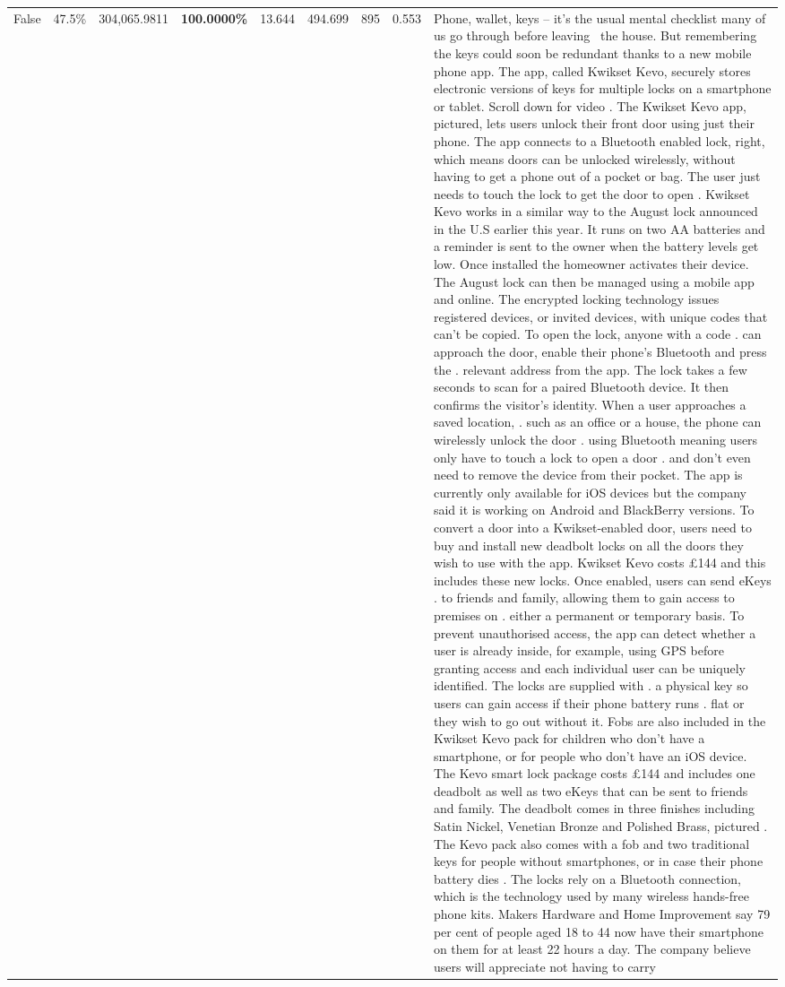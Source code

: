 \begin{table}[H]
\begin{tabular}{lllrlllll}
False & 47.5\% & \color{red} 304,065.9811 & \bfseries \color{red} 100.0000\% & 13.644 & 494.699 & 895 & 0.553 & Phone, wallet, keys – it’s the usual mental checklist many of us go through before leaving  the house. But remembering the keys could soon be redundant thanks to a new mobile phone app. The app, called Kwikset Kevo, securely stores electronic versions of keys for multiple locks on a smartphone or tablet. Scroll down for video . The Kwikset Kevo app, pictured, lets users unlock their front door using just their phone. The app connects to a Bluetooth enabled lock, right, which means doors can be unlocked wirelessly, without having to get a phone out of a pocket or bag. The user just needs to touch the lock to get the door to open . Kwikset Kevo works in a similar way to the August lock announced in the U.S earlier this year. It runs on two AA batteries and a reminder is sent to the owner when the battery levels get low. Once installed the homeowner activates their device. The August lock can then be managed using a mobile app and online. The encrypted locking technology issues registered devices, or invited devices, with unique codes that can't be copied. To open the lock, anyone with a code . can approach the door, enable their phone's Bluetooth and press the . relevant address from the app. The lock takes a few seconds to scan for a paired Bluetooth device. It then confirms the visitor's identity. When a user approaches a saved location, . such as an office or a house, the phone can wirelessly unlock the door . using Bluetooth meaning users only have to touch a lock to open a door . and don't even need to remove the device from their pocket. The app is currently only available for iOS devices but the company said it is working on Android and BlackBerry versions. To convert a door into a Kwikset-enabled door, users need to buy and install new deadbolt locks on all the doors they wish to use with the app. Kwikset Kevo costs £144 and this includes these new locks. Once enabled, users can send eKeys . to friends and family, allowing them to gain access to premises on . either a permanent or temporary basis. To prevent unauthorised access, the app can detect whether a user is already inside, for example, using GPS before granting access and each individual user can be uniquely identified. The locks are supplied with . a physical key so users can gain access if their phone battery runs . flat or they wish to go out without it. Fobs are also included in the Kwikset Kevo pack for children who don't have a smartphone, or for people who don't have an iOS device. The Kevo smart lock package costs £144 and includes one deadbolt as well as two eKeys that can be sent to friends and family. The deadbolt comes in three finishes including Satin Nickel, Venetian Bronze and Polished Brass, pictured . The Kevo pack also comes with a fob and two traditional keys for people without smartphones, or in case their phone battery dies . The locks rely on a Bluetooth connection, which is the technology used by many wireless hands-free phone kits. Makers Hardware and Home Improvement say 79 per cent of people aged 18 to 44 now have their smartphone on them for at least 22 hours a day. The company believe users will appreciate not having to carry 
\end{tabular}
\end{table}
